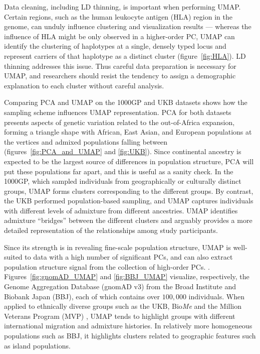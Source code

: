 \documentclass[12pt]{article}
\begin{document}
Data cleaning, including LD thinning, is important when performing UMAP. Certain regions, such as the human leukocyte antigen (HLA) region in the genome, can unduly influence clustering and visualization results --- whereas the influence of HLA might be only observed in a higher-order PC, UMAP can identify the clustering of haplotypes at a single, densely typed locus and represent carriers of that haplotype as a distinct cluster (figure~\ref{fig:HLA}). LD thinning addresses this issue. Thus careful data preparation is necessary for UMAP, and researchers should resist the tendency to assign a demographic explanation to each cluster without careful analysis. 

Comparing PCA and UMAP on the 1000GP and UKB datasets shows how the sampling scheme influences UMAP representation. PCA for both datasets presents aspects of genetic variation related to the out-of-Africa expansion, forming a triangle shape with African, East Asian, and European populations at the vertices and admixed populations falling between (figures~\ref{fig:PCA_and_UMAP} and \ref{fig:UKB}). Since continental ancestry is expected to be the largest source of differences in population structure, PCA will put these populations far apart, and this is useful as a sanity check. In the 1000GP, which sampled individuals from geographically or culturally distinct groups, UMAP forms clusters corresponding to the different groups. By contrast, the UKB performed population-based sampling, and UMAP captures individuals with different levels of admixture from different ancestries. UMAP identifies admixture ``bridges'' between the different clusters and arguably provides a more detailed representation of the relationships among study participants. 

Since its strength is in revealing fine-scale population structure, UMAP is well-suited to data with a high number of significant PCs, and can also extract population structure signal from the collection of high-order PCs. \cite{diaz-papkovich_umap_2019}.  Figures~\ref{fig:gnomAD_UMAP} and \ref{fig:BBJ_UMAP} visualize, respectively, the Genome Aggregation Database (gnomAD v3) from the Broad Institute\cite{karczewski_mutational_2020} and Biobank Japan (BBJ)\cite{nagai2017overview}\cite{sakaue_dimensionality_2020}, each of which contains over $100,000$ individuals. When applied to ethnically diverse groups such as the UKB, Bio\textit{Me}\cite{belbin_towards_2019} and the Million Veterans Program (MVP) \cite{hunter-zinck_genotyping_2020}, UMAP tends to highlight groups with different international migration and admixture histories. In relatively more homogeneous populations such as BBJ, it highlights clusters related to geographic features such as island populations.
\end{document}
